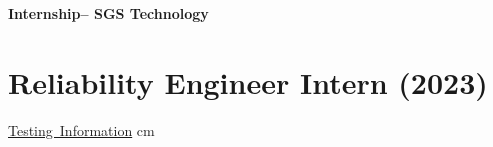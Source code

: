 \documentclass[10pt, letterpaper]{article}
\let\hrefWithoutArrow\href
\renewcommand{\href}[2]{\hrefWithoutArrow{#1}{\ifthenelse{\equal{#2}{}}{ }{#2 }\raisebox{.15ex}{\footnotesize \faExternalLink*}}}
\begin{document}
    \newpage
    {\fontsize{30pt}{30pt} \textbf{Internship-- SGS Technology}} %
    
    \vspace{0.3cm}
    
    \section{Reliability Engineer Intern (2023)}

    \normalsize
    \mbox{\hrefWithoutArrow{https://github.com/liu092111/College_Portfolio/blob/0d5be6fa66553ebed94cd609794cb3832255d13b/SGS\%20Inspection\%20Intern/\%E5\%8F\%AF\%E9\%9D\%A0\%E5\%BA\%A6\%E6\%A9\%9F\%E5\%8F\%B0\%E7\%9B\%B8\%E9\%97\%9C\%E8\%B3\%87\%E6\%96\%99.pdf}{{\footnotesize\faLink}\hspace*{0.13 cm}Testing Information}}%
     cm%
    
\end{document}
